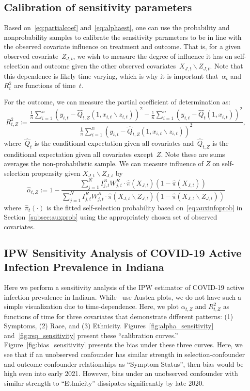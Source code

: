 \documentclass[11pt]{amsart}
\numberwithin{equation}{section}
\theoremstyle{plain}
\begin{document}
\subsection{Calibration of sensitivity parameters}

Based on~\eqref{eq:partialcoef} and~\eqref{eq:alphaest}, one can use the probability and nonprobability samples to calibrate the sensitivity parameters to be in line with the observed covariate influence on treatment and outcome.  That is, for a given observed covariate~$Z_{J,t}$, we wish to measure the degree of influence it has on self-selection and outcome given the other observed covariates~$X_{J,t} \backslash Z_{J,t}$.  Note that this dependence is likely time-varying, which is why it is important that~$\alpha_t$ and~$R_t^2$ are functions of time~$t$.

For the outcome, we can measure the partial coefficient of determination as:
$$
R_{t, Z}^2 := \frac{\frac{1}{n} \sum_{i=1}^n (y_{i,t} - \hat Q_{t,Z} (1, x_{i,t} \backslash z_{i,t}) )^2 - \frac{1}{n} \sum_{i=1}^n (y_{i,t} - \hat Q_{t} (1, x_{i,t}) )^2}{\frac{1}{n} \sum_{i=1}^n (y_{i,t} - \hat Q_{t,Z} (1, x_{i,t} \backslash z_{i,t}) )^2},
$$
where~$\hat Q_t$ is the conditional expectation given all covariates and~$\hat Q_{t,Z}$ is the conditional expectation given all covariates except~$Z$.  Note these are sums averages the non-probabilistic sample.  We can measure influence of $Z$ on self-selection propensity given $X_{J,t} \backslash Z_{J,t}$ by
$$
\hat \alpha_{t, Z} := 1 - \frac{\sum_{j=1}^N I_{j,t}^R W_{j,t}^R \cdot \hat \pi(X_{J,t}) (1- \hat \pi(X_{J,t}))}{\sum_{j=1}^N I_{j,t}^R W_{j,t}^R \cdot \hat \pi(X_{J,t} \backslash Z_{J,t}) (1- \hat \pi(X_{J,t} \backslash Z_{J,t}))}
$$
where~$\hat \pi_t (\cdot)$ is the fitted self-selection probability based on~\eqref{eq:auxinfoprob} in Section~\ref{subsec:auxprob} using the appropriately chosen set of observed covariates.

\subsection{IPW Sensitivity Analysis of COVID-19 Active Infection Prevalence in Indiana}

Here we perform a sensitivity analysis of the IPW estimator of COVID-19 active infection prevalence in Indiana.  While~\cite{Veitch2020} use Austen plots, we do not have such a simple visualization due to time-dependence.  Here, we plot  $\alpha_{t,Z}$ and $R^2_{t,Z}$ as functions of time for three covariates that demonstrate different patterns: (1) Symptoms, (2) Race, and (3) Ethnicity.  Figures~\ref{fig:alpha_sensitivity} and~\ref{fig:rsq_sensitivity} present these ``calibration curves.'' Figure~\ref{fig:bias_sensitivity} presents the bias under these three curves.  Here, we see that if an unobserved confounder has similar strength in selection-confounder and outcome-confounder relationships as ``Symptom Status'', then bias would be high even into early 2021.  However, bias under an unobserved confounder with similar strength to ``Ethnicity'' dissipates significantly by late 2020.
\end{document}
